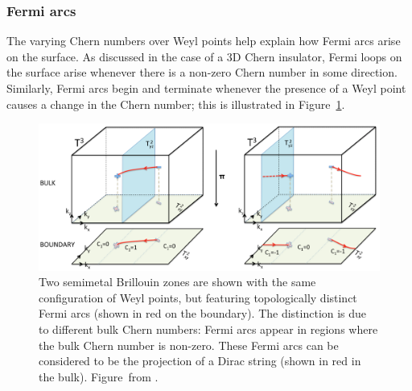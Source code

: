 \subsubsection{Fermi arcs}

The varying Chern numbers over Weyl points help explain how Fermi arcs arise on the surface. As discussed in the case of a 3D Chern insulator, Fermi loops on the surface arise whenever there is a non-zero Chern number in some direction. Similarly, Fermi arcs begin and terminate whenever the presence of a Weyl point causes a change in the Chern number; this is illustrated in Figure~\ref{fig:Fermi-arc-Chern}.
\begin{figure}[htb!]
	\centering
	\includegraphics[width=\linewidth]{Images/Fermi-arc-Chern}
	\caption{
		Two semimetal Brillouin zones are shown with the same configuration of Weyl points, but featuring topologically distinct Fermi arcs (shown in red on the boundary). The distinction is due to different bulk Chern numbers: Fermi arcs appear in regions where the bulk Chern number is non-zero. These Fermi arcs can be considered to be the projection of a Dirac string (shown in red in the bulk).
		Figure~from \cite{Mathai_math-review}.}
	\label{fig:Fermi-arc-Chern}
\end{figure}

